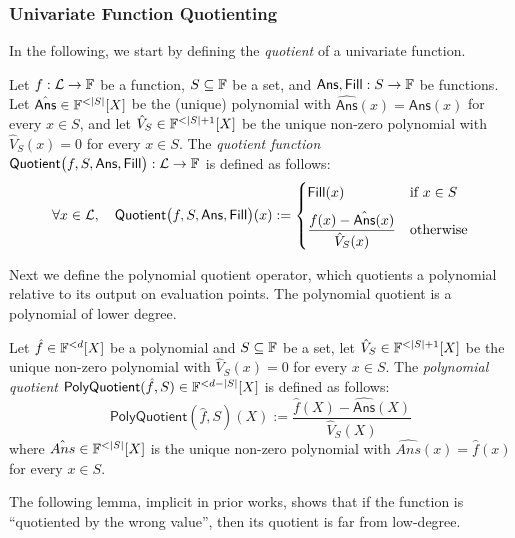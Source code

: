 \subsubsection{Univariate Function Quotienting}\label{sec:quotienting}

In the following, we start by defining the \emph{quotient} of a univariate function.
\begin{definition}\label{def:quotient}
    Let $f:\mathcal{L}\to\mathbb{F}$ be a function, $S\subseteq\mathbb{F}$ be a set, and $\mathsf{Ans},\mathsf{Fill}: S\rightarrow\mathbb{F}$ be functions. Let $\hat{\mathsf{Ans}}\in\field^{<|S|}[X]$ be the (unique) polynomial with $\hat{\mathsf{Ans}}(x)=\mathsf{Ans}(x)$ for every $x\in S$, and let $\hat{V}_S\in\field^{<|S|+1}[X]$ be the unique non-zero polynomial with $\hat{V}_S(x)=0$ for every $x\in S$.
    The \emph{quotient function} $\mathsf{Quotient}\bigl(f,S,\mathsf{Ans},\mathsf{Fill}\bigr): \mathcal{L}\to\mathbb{F}$
    is defined as follows:
    \[
    \forall x \in \mathcal{L},\quad
    \mathsf{Quotient}\bigl(f,S,\mathsf{Ans},\mathsf{Fill}\bigr)(x)  
    :=
    \begin{cases}
        \mathsf{Fill}(x)
        & \text{if } x \in S \\[6pt]
        \dfrac{f(x) - \hat{\mathsf{Ans}}(x)}{\hat{V}_S(x)}
        & \text{otherwise}
    \end{cases}
    \]
\end{definition}

Next we define the polynomial quotient operator, which quotients a polynomial relative to its output on evaluation points. The polynomial quotient is a polynomial of lower degree.

\begin{definition}\label{def:poly_quotient}
    Let $\hat{f}\in\mathbb{F}^{<d}[X]$ be a polynomial and $S\subseteq\mathbb{F}$ be a set, let $\hat{V}_S\in\field^{<|S|+1}[X]$ be the unique non-zero polynomial with $\hat{V}_S(x)=0$ for every $x\in S$. The \emph{polynomial quotient} $\mathsf{PolyQuotient}(\hat{f},S)\in\mathbb{F}^{<d-|S|}[X]$ is defined as follows:
    \[
            \mathsf{PolyQuotient}(\hat{f},S)(X):=\frac{\hat{f}(X)-\hat{\mathsf{Ans}}(X)}{\hat{V}_S(X)}
    \]
where $\hat{Ans}\in\field^{<|S|}[X]$ is the unique non-zero polynomial with $\hat{Ans}(x)=\hat{f}(x)$ for every $x \in S$.
\end{definition}

The following lemma, implicit in prior works, shows that if the function is ``quotiented by the wrong value'', then its quotient is far from low-degree.

